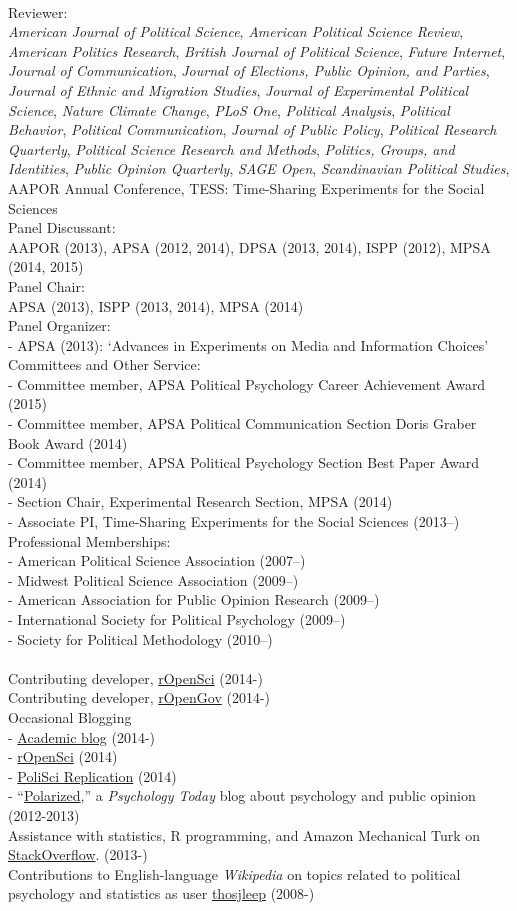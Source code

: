 \documentclass[12pt]{article}
\newcommand{\topic}[1]{\pagebreak[3]\indent {\color{lg}{\footnotesize #1 }}\\}
\newcommand{\entry}[1]{\indent {\color{lg}\guillemotright}\hspace{2pt}#1\vspace{.25em}\\}
\newcommand{\subentry}[1]{{\color{lg}-} #1\vspace{.25em}\\}
\begin{document}
\topic{Disciplinary}
\entry{Reviewer:\\{\em American Journal of Political Science}, {\em American Political Science Review}, {\em American Politics Research}, {\em British Journal of Political Science}, {\em Future Internet}, {\em Journal of Communication}, {\em Journal of Elections, Public Opinion, and Parties}, {\em Journal of Ethnic and Migration Studies}, {\em Journal of Experimental Political Science}, {\em Nature Climate Change}, {\em PLoS One}, {\em Political Analysis}, {\em Political Behavior}, {\em Political Communication}, {\em Journal of Public Policy}, {\em Political Research Quarterly}, {\em Political Science Research and Methods}, {\em Politics, Groups, and Identities}, {\em Public Opinion Quarterly}, {\em SAGE Open}, {\em Scandinavian Political Studies}, AAPOR Annual Conference, TESS: Time-Sharing Experiments for the Social Sciences}
\entry{Panel Discussant:\\AAPOR (2013), APSA (2012, 2014), DPSA (2013, 2014), ISPP (2012), MPSA (2014, 2015)}
\entry{Panel Chair:\\APSA (2013), ISPP (2013, 2014), MPSA (2014)}
\entry{Panel Organizer:}
\subentry{APSA (2013): `Advances in Experiments on Media and Information Choices'}
\entry{Committees and Other Service:}
\subentry{Committee member, APSA Political Psychology Career Achievement Award (2015)}
\subentry{Committee member, APSA Political Communication Section Doris Graber Book Award (2014)}
\subentry{Committee member, APSA Political Psychology Section Best Paper Award (2014)}
\subentry{Section Chair, Experimental Research Section, MPSA (2014)}
\subentry{Associate PI, Time-Sharing Experiments for the Social Sciences (2013--)}
\entry{Professional Memberships:}
\subentry{American Political Science Association (2007--)}
\subentry{Midwest Political Science Association (2009--)}
\subentry{American Association for Public Opinion Research (2009--)}
\subentry{International Society for Political Psychology (2009--)}
\subentry{Society for Political Methodology (2010--)}

\topic{Public Engagement}
\entry{Contributing developer, \href{http://ropensci.org/}{rOpenSci} (2014-)}
\entry{Contributing developer, \href{http://ropengov.github.io/}{rOpenGov} (2014-)}
\entry{Occasional Blogging}
\subentry{\href{http://thomasleeper.com/blog}{Academic blog} (2014-)}
\subentry{\href{http://ropensci.org/blog/}{rOpenSci} (2014)}
\subentry{\href{http://politicalsciencereplication.wordpress.com/}{PoliSci Replication} (2014)}
\subentry{``\href{http://www.psychologytoday.com/blog/polarized}{Polarized},'' a {\em Psychology Today} blog about psychology and public opinion (2012-2013)}
\entry{Assistance with statistics, R programming, and Amazon Mechanical Turk on \href{http://stackoverflow.com/users/2338862/thomas}{StackOverflow}. (2013-)}
\entry{Contributions to English-language {\em Wikipedia} on topics related to political psychology and statistics as user \href{http://en.wikipedia.org/wiki/Special:Contributions/Thosjleep}{thosjleep} (2008-)}
\end{document}
